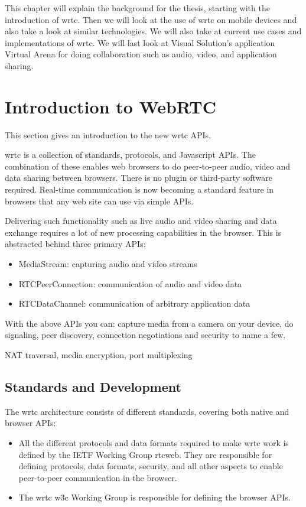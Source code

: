 
This chapter will explain the background for the thesis, starting with the introduction of \gls{wrtc}. Then we will look at the use of \gls{wrtc} on mobile devices and also take a look at similar technologies. We will also take at current use cases and implementations of \gls{wrtc}. We will last look at Visual Solution's application Virtual Arena for doing collaboration such as audio, video, and application sharing.

\section{Introduction to WebRTC}

This section gives an introduction to the new \gls{wrtc} APIs.

\gls{wrtc} is a collection of standards, protocols, and Javascript APIs. The combination of these enables web browsers to do peer-to-peer audio, video and data sharing between browsers. There is no plugin or third-party software required. Real-time communication is now becoming a standard feature in browsers that any web site can use via simple APIs.

Delivering such functionality such as live audio and video sharing and data exchange requires a lot of new processing capabilities in the browser. This is abstracted behind three primary APIs:

\begin{itemize}
\item MediaStream: capturing audio and video streams
\item RTCPeerConnection: communication of audio and video data
\item RTCDataChannel: communication of arbitrary application data
\end{itemize}

With the above APIs you can: capture media from a camera on your device, do signaling, peer discovery, connection negotiations and security to name a few.

NAT traversal, media encryption, port multiplexing

\subsection{Standards and Development}
The \gls{wrtc} architecture consists of different standards, covering both native and browser APIs:

\begin{itemize}
\item All the different protocols and data formats required to make \gls{wrtc} work is defined by the IETF Working Group \gls{rtcweb}. They are responsible for defining protocols, data formats, security, and all other aspects to enable peer-to-peer communication in the browser.
\item The \gls{wrtc} \gls{w3c} Working Group is responsible for defining the browser APIs.
\end{itemize}

